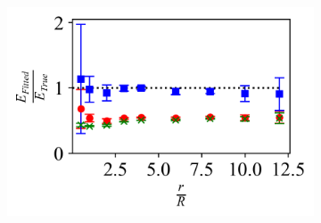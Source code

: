 \begin{figure}[H]
\begin{subfigure}[t]{0.32\textwidth}
        \caption{\label{fig: Sphere-Sphere-Youngs_Modulus} }
        \includegraphics[width=1\linewidth]{Figures/Sphere-Sphere-Youngs_Modulus.png}
    \end{subfigure}
    
    \hfill
    \vspace{-0.4in}
    

\end{figure}
